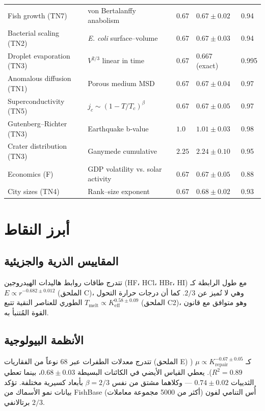 \documentclass[11pt,a4paper]{article}
\newcommand{\betaf}{\beta}
\begin{document}
\begin{otherlanguage}{english}
\begin{table}[htbp]
\begin{tabular}{p{3.5cm}p{5.0cm}p{2.1cm}p{3.5cm}p{1.4cm}}
				Fish growth (TN7) & von Bertalanffy anabolism & \(0.67\) & \(0.67 \pm 0.02\) & 0.94 \\
				Bacterial scaling (TN2) & \emph{E. coli} surface–volume & \(0.67\) & \(0.67 \pm 0.03\) & 0.94 \\
				Droplet evaporation (TN3) & \(V^{2/3}\) linear in time & \(0.67\) & \(0.667\) (exact) & 0.995 \\
				Anomalous diffusion (TN1) & Porous medium MSD & \(0.67\) & \(0.67 \pm 0.04\) & 0.97 \\
				Superconductivity (TN5) & \(j_c \sim (1-T/T_c)^{\beta}\) & \(0.67\) & \(0.67 \pm 0.05\) & 0.97 \\
				Gutenberg–Richter (TN3) & Earthquake b‑value & \(1.0\) & \(1.01 \pm 0.03\) & 0.98 \\
				Crater distribution (TN3) & Ganymede cumulative & \(2.25\) & \(2.24 \pm 0.10\) & 0.95 \\
				Economics (F) & GDP volatility vs. solar activity & \(0.67\) & \(0.67 \pm 0.05\) & 0.88 \\
				City sizes (TN4) & Rank–size exponent & \(0.67\) & \(0.68 \pm 0.02\) & 0.93 \\
				\bottomrule
			\end{tabular}
		\end{table}
	\end{otherlanguage}
	
	\section{أبرز النقاط}
	
	\subsection{المقاييس الذرية والجزيئية}
	تتدرج طاقات روابط هاليدات الهيدروجين (HF، HCl، HBr، HI) مع طول الرابطة كـ \(E \propto r^{-0.682\pm0.012}\) (الملحق C)، وهي لا تُميز عن \(2/3\). كما أن درجات حرارة التحول الطوري للعناصر النقية تتبع \(T_{\text{melt}} \propto K_{\mathrm{eff}}^{0.58\pm0.09}\) (الملحق C2)، وهو متوافق مع قانون القوة المُتنبأ به.
	
	\subsection{الأنظمة البيولوجية}
	تتدرج معدلات الطفرات عبر 68 نوعاً من الفقاريات (الملحق E) كـ \(\mu \propto K_{\mathrm{repair}}^{-0.67\pm0.05}\) (\(R^2=0.89\)). يعطي القياس الأيضي في الكائنات البسيطة \(0.68\pm0.03\)، بينما تعطي الثدييات \(0.74\pm0.02\) — وكلاهما مشتق من نفس \(\betaf = 2/3\) بأبعاد كسيرية مختلفة. تؤكد بيانات نمو الأسماك من FishBase (أكثر من 5000 مجموعة معاملات) أُس التنامي لفون برتالانفي \(2/3\).
	
\end{document}
